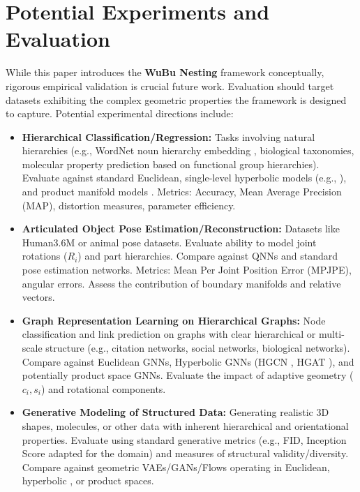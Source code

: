 \documentclass[11pt, twoside]{article} %
\newcommand{\wubu}{\textbf{WuBu Nesting}} %
\begin{document}
\section{Potential Experiments and Evaluation}
\label{sec:experiments}

While this paper introduces the \wubu{} framework conceptually, rigorous empirical validation is crucial future work. Evaluation should target datasets exhibiting the complex geometric properties the framework is designed to capture. Potential experimental directions include:

\begin{itemize}
    \item \textbf{Hierarchical Classification/Regression:} Tasks involving natural hierarchies (e.g., WordNet noun hierarchy embedding \cite{NickelKiela2017}, biological taxonomies, molecular property prediction based on functional group hierarchies). Evaluate against standard Euclidean, single-level hyperbolic models (e.g., \cite{GaneaEtAl2018}), and product manifold models \cite{GuEtAl2019}. Metrics: Accuracy, Mean Average Precision (MAP), distortion measures, parameter efficiency.
    \item \textbf{Articulated Object Pose Estimation/Reconstruction:} Datasets like Human3.6M or animal pose datasets. Evaluate ability to model joint rotations ($R_i$) and part hierarchies. Compare against QNNs \cite{GrassucciEtAl2021} and standard pose estimation networks. Metrics: Mean Per Joint Position Error (MPJPE), angular errors. Assess the contribution of boundary manifolds and relative vectors.
    \item \textbf{Graph Representation Learning on Hierarchical Graphs:} Node classification and link prediction on graphs with clear hierarchical or multi-scale structure (e.g., citation networks, social networks, biological networks). Compare against Euclidean GNNs, Hyperbolic GNNs (HGCN \cite{ChamiEtAl2019}, HGAT \cite{ZhangEtAl2021}), and potentially product space GNNs. Evaluate the impact of adaptive geometry ($c_i, s_i$) and rotational components.
    \item \textbf{Generative Modeling of Structured Data:} Generating realistic 3D shapes, molecules, or other data with inherent hierarchical and orientational properties. Evaluate using standard generative metrics (e.g., FID, Inception Score adapted for the domain) and measures of structural validity/diversity. Compare against geometric VAEs/GANs/Flows operating in Euclidean, hyperbolic \cite{SkopekEtAl2020}, or product spaces.

\end{itemize}
\end{document}

